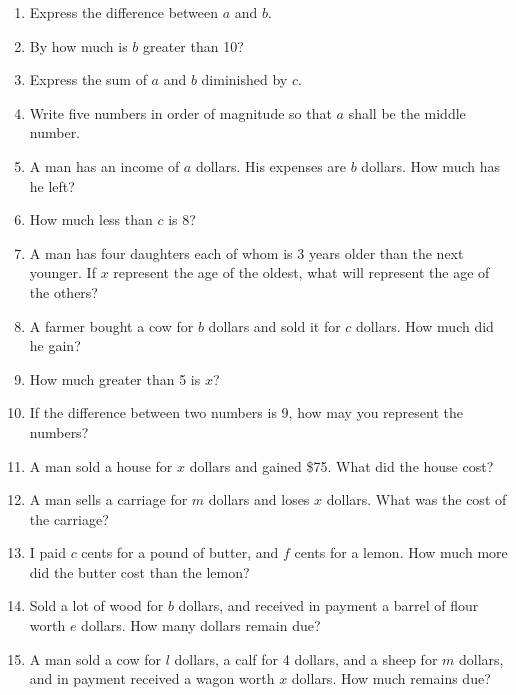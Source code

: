 \documentclass{book}
\begin{document}
\begin{enumerate}
\item Express the difference between $a$ and $b$.

\item By how much is $b$ greater than 10?

\item Express the sum of $a$ and $b$ diminished by $c$.

\item Write five numbers in order of magnitude so that $a$ shall
be the middle number.

\item A man has an income of $a$ dollars. His expenses are $b$
dollars. How much has he left?

\item How much less than $c$ is 8?

\item A man has four daughters each of whom is 3 years older than
the next younger. If $x$ represent the age of the oldest, what
will represent the age of the others?

\item A farmer bought a cow for $b$ dollars and sold it for $c$
dollars. How much did he gain?

\item How much greater than 5 is $x$?

\item If the difference between two numbers is 9, how may you
represent the numbers?

\item A man sold a house for $x$ dollars and gained \$75. What did
the house cost?

\item A man sells a carriage for $m$ dollars and loses $x$
dollars. What was the cost of the carriage?

\item I paid $c$ cents for a pound of butter, and $f$ cents for a
lemon. How much more did the butter cost than the lemon?

\item Sold a lot of wood for $b$ dollars, and received in payment
a barrel of flour worth $e$ dollars. How many dollars remain due?

\item A man sold a cow for $l$ dollars, a calf for 4 dollars, and
a sheep for $m$ dollars, and in payment received a wagon worth $x$
dollars. How much remains due?


\end{enumerate}
\end{document}
